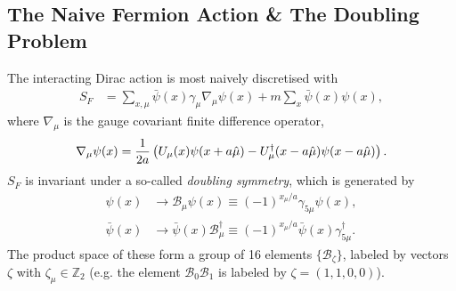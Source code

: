 \subsection{The Naive Fermion Action \& The Doubling Problem}

The interacting Dirac action is most naively discretised with
\begin{align}
  S_F &= \sum_{x,\mu} \bar{\psi}(x) \gamma_{\mu} \nabla_{\mu} \psi(x) + m\sum_x \bar{\psi}(x) \psi(x),
  \label{eq:naivefermions}
\end{align}
where $\nabla_{\mu}$ is the gauge covariant finite difference operator,
\begin{align}
  \nabla_{\mu} \psi(x) = {1\over 2a} \left( U_{\mu} (x) \psi(x+a\hat{\mu}) - U^{\dagger}_{\mu}(x-a\hat{\mu})\psi(x-a\hat{\mu}) \right).
  \label{eq:lat_derivative}
\end{align}
$S_F$ is invariant under a so-called {\it{doubling symmetry}}, which is generated by
\begin{align}
  \label{eq:doublingsymmetry}
  \psi(x) & \to \mathcal{B}_{\mu} \psi(x) \equiv  (-1)^{x_{\mu}/a} \gamma_{5\mu} \psi(x), \\
  \bar{\psi}(x) & \to \bar{\psi}(x)\mathcal{B}^{\dagger}_{\mu} \equiv (-1)^{x_{\mu}/a} \bar{\psi}(x) \gamma^{\dagger}_{5\mu}.
\end{align}
The product space of these form a group of 16 elements $\{\mathcal{B}_{\zeta}\}$, labeled by vectors $\zeta$ with $\zeta_{\mu}\in \mathbb{Z}_2$ (e.g. the element $\mathcal{B}_{0}\mathcal{B}_{1}$ is labeled by $\zeta=(1,1,0,0)$).

